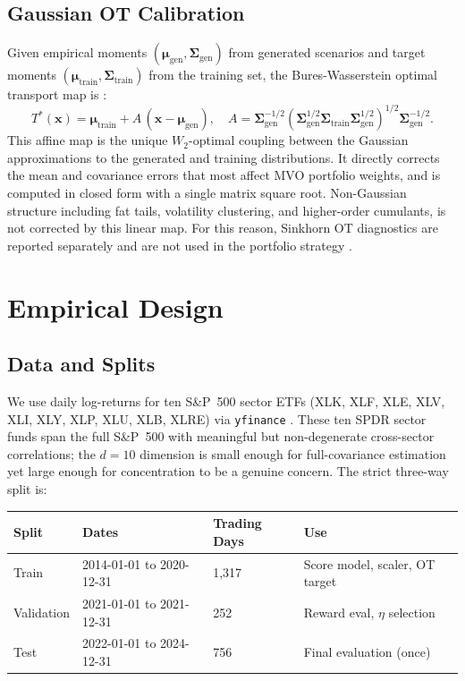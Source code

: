 \documentclass{article}
\newcommand{\bSigma}{\boldsymbol{\Sigma}}
\newcommand{\bmu}{\boldsymbol{\mu}}
\newcommand{\bx}{\mathbf{x}}
\begin{document}
\subsection{Gaussian OT Calibration}

Given empirical moments $(\bmu_\text{gen}, \bSigma_\text{gen})$ from generated
scenarios and target moments $(\bmu_\text{train}, \bSigma_\text{train})$ from the
training set, the Bures-Wasserstein optimal transport map is \citep{bhatia2019bures}:
\begin{equation}
  T^*(\bx)
  = \bmu_\text{train} + A\,(\bx - \bmu_\text{gen}),\quad
  A = \bSigma_\text{gen}^{-1/2}
      \!\left(\bSigma_\text{gen}^{1/2}\bSigma_\text{train}\bSigma_\text{gen}^{1/2}\right)^{\!1/2}
      \bSigma_\text{gen}^{-1/2}.
  \label{eq:gauss-ot}
\end{equation}
This affine map is the unique $W_2$-optimal coupling between the Gaussian
approximations to the generated and training distributions. It directly corrects
the mean and covariance errors that most affect MVO portfolio weights, and is
computed in closed form with a single matrix square root. Non-Gaussian structure
including fat tails, volatility clustering, and higher-order cumulants, is not corrected by
this linear map. For this reason, Sinkhorn OT diagnostics are reported separately
and are not used in the portfolio strategy \citep{peyre2019computational}.

\section{Empirical Design}
\label{sec:design}

\subsection{Data and Splits}

We use daily log-returns for ten S\&P~500 sector ETFs (XLK, XLF, XLE, XLV, XLI,
XLY, XLP, XLU, XLB, XLRE) via \texttt{yfinance} \citep{aroussi2019yfinance}.
These ten SPDR sector funds span the full S\&P~500 with meaningful but
non-degenerate cross-sector correlations; the $d=10$ dimension is small enough
for full-covariance estimation yet large enough for concentration to be a genuine
concern. The strict three-way split is:

\begin{center}
\begin{tabular}{llll}
\toprule
\textbf{Split} & \textbf{Dates} & \textbf{Trading Days} & \textbf{Use} \\
\midrule
Train      & 2014-01-01 to 2020-12-31 & 1,317 & Score model, scaler, OT target \\
Validation & 2021-01-01 to 2021-12-31 &   252 & Reward eval, $\eta$ selection \\
Test       & 2022-01-01 to 2024-12-31 &   756 & Final evaluation (once) \\
\bottomrule
\end{tabular}
\end{center}
\end{document}
